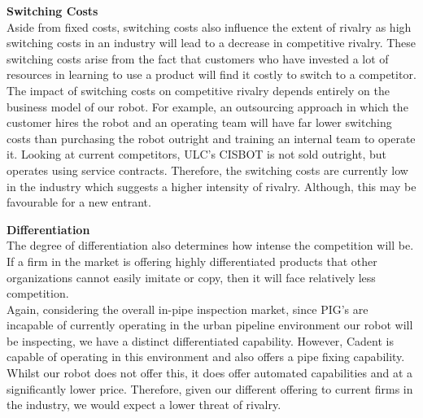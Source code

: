 \documentclass[11pt]{article}		%
\begin{document}
        \textbf{Switching Costs}\\
        Aside from fixed costs, switching costs also influence the extent of rivalry as high switching costs in an industry will lead to a decrease in competitive rivalry. These switching costs arise from the fact that customers who have invested a lot of resources in learning to use a product will find it costly to switch to a competitor. \\
        \hspace*{3ex}The impact of switching costs on competitive rivalry depends entirely on the business model of our robot. For example, an outsourcing approach in which the customer hires the robot and an operating team will have far lower switching costs than purchasing the robot outright and training an internal team to operate it. Looking at current competitors, ULC’s CISBOT is not sold outright, but operates using service contracts. Therefore, the switching costs are currently low in the industry which suggests a higher intensity of rivalry. Although, this may be favourable for a new entrant. 

        \textbf{Differentiation}\\
        The degree of differentiation also determines how intense the competition will be. If a firm in the market is offering highly differentiated products that other organizations cannot easily imitate or copy, then it will face relatively less competition.\\
        \hspace*{3ex}Again, considering the overall in-pipe inspection market, since PIG’s are incapable of currently operating in the urban pipeline environment our robot will be inspecting, we have a distinct differentiated capability. However, Cadent is capable of operating in this environment and also offers a pipe fixing capability. Whilst our robot does not offer this, it does offer automated capabilities and at a significantly lower price. Therefore, given our different offering to current firms in the industry, we would expect a lower threat of rivalry. 
        
\end{document}
